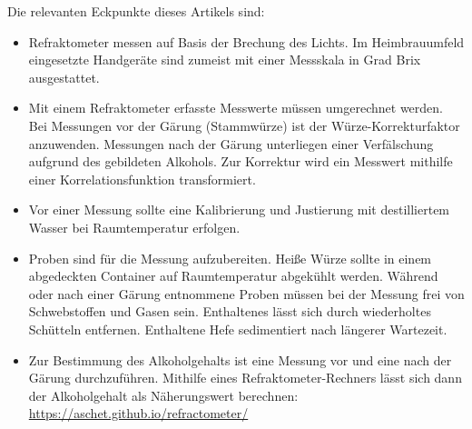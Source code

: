 \documentclass[a4paper,parskip=half]{scrartcl}
\begin{document}
Die relevanten Eckpunkte dieses Artikels sind:

\begin{itemize}
\item Refraktometer messen auf Basis der Brechung des Lichts. Im
Heimbrauumfeld eingesetzte Handgeräte sind zumeist mit einer Messskala
in Grad Brix ausgestattet.
\item Mit einem Refraktometer erfasste Messwerte müssen umgerechnet
werden. Bei Messungen vor der Gärung (Stammwürze) ist der
Würze-Korrekturfaktor anzuwenden. Messungen nach
der Gärung unterliegen einer Verfälschung aufgrund des gebildeten
Alkohols. Zur Korrektur wird ein Messwert mithilfe einer
Korrelationsfunktion transformiert.
\item Vor einer Messung sollte eine Kalibrierung und Justierung
mit destilliertem Wasser bei Raumtemperatur erfolgen.
\item Proben sind für die Messung aufzubereiten. Heiße Würze
sollte in einem abgedeckten Container auf Raumtemperatur
abgekühlt werden. Während oder nach einer Gärung entnommene
Proben müssen bei der Messung frei von Schwebstoffen und Gasen sein.
Enthaltenes  lässt sich durch wiederholtes Schütteln
entfernen. Enthaltene Hefe sedimentiert nach längerer Wartezeit.
\item Zur Bestimmung des Alkoholgehalts ist eine Messung
vor und eine nach der Gärung durchzuführen. Mithilfe eines
Refraktometer-Rechners lässt sich dann der Alkoholgehalt
als Näherungswert berechnen: \url{https://aschet.github.io/refractometer/}

\end{itemize}

\printbibliography[title=Quellen]
\end{document}
